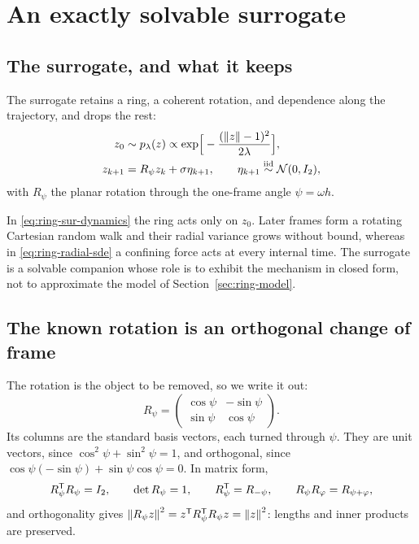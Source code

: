 \section{An exactly solvable surrogate}\label{sec:ring-surrogate}

\subsection{The surrogate, and what it keeps}

The surrogate retains a ring, a coherent rotation, and dependence along the
trajectory, and drops the rest:
\begin{align}
  z_0 &\sim p_\lambda(z) \propto
        \exp\!\Big[-\frac{(\left\lVert z \right\rVert-1)^2}{2\lambda}\Big] ,
  \label{eq:ring-sur-prior} \\
  z_{k+1} &= R_\psi z_k + \sigma \eta_{k+1} ,
        \qquad \eta_{k+1} \stackrel{\text{iid}}{\sim} \mathcal{N}(0, I_2) ,
  \label{eq:ring-sur-dynamics}
\end{align}
with $R_\psi$ the planar rotation through the one-frame angle
$\psi = \omega h$.

\begin{remark}
\label{rem:ring-surrogate-scope}
In \eqref{eq:ring-sur-dynamics} the ring acts only on $z_0$. Later frames form
a rotating Cartesian random walk and their radial variance grows without bound,
whereas in \eqref{eq:ring-radial-sde} a confining force acts at every internal
time. The surrogate is a solvable companion whose role is to exhibit the
mechanism in closed form, not to approximate the model of
Section~\ref{sec:ring-model}.
\end{remark}

\subsection{The known rotation is an orthogonal change of frame}

The rotation is the object to be removed, so we write it out:
\begin{equation}
  R_\psi =
  \begin{pmatrix} \cos\psi & -\sin\psi \\ \sin\psi & \cos\psi \end{pmatrix} .
  \label{eq:ring-rotation}
\end{equation}
Its columns are the standard basis vectors, each turned through $\psi$. They
are unit vectors, since $\cos^2\psi + \sin^2\psi = 1$, and orthogonal, since
$\cos\psi(-\sin\psi) + \sin\psi\cos\psi = 0$. In matrix form,
\begin{equation}
  R_\psi^{\mathsf{T}} R_\psi = I_2, \qquad \det R_\psi = 1, \qquad
  R_\psi^{\mathsf{T}} = R_{-\psi}, \qquad R_\psi R_\varphi = R_{\psi+\varphi} ,
  \label{eq:ring-rot-props}
\end{equation}
and orthogonality gives
$\left\lVert R_\psi z \right\rVert^2 = z^{\mathsf{T}} R_\psi^{\mathsf{T}} R_\psi z = \left\lVert z \right\rVert^2$: lengths and
inner products are preserved.


